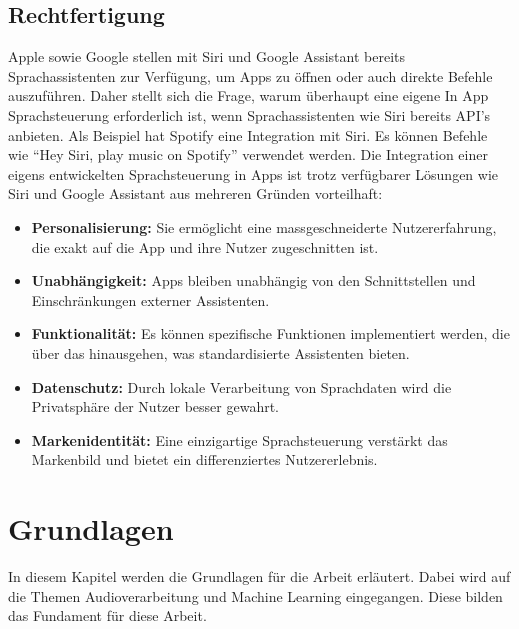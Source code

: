 \documentclass[11pt,a4paper]{article}
\begin{document}
\subsection{Rechtfertigung}
Apple sowie Google stellen mit Siri und Google Assistant bereits Sprachassistenten zur 
Verfügung, um Apps zu öffnen oder auch direkte Befehle auszuführen. Daher stellt sich die Frage, 
warum überhaupt eine eigene In App Sprachsteuerung erforderlich ist, wenn Sprachassistenten wie Siri bereits 
API's anbieten. Als Beispiel hat Spotify eine Integration mit Siri. Es können Befehle wie 
``Hey Siri, play music on Spotify'' verwendet werden. Die Integration einer eigens entwickelten 
Sprachsteuerung in Apps ist trotz verfügbarer Lösungen wie Siri und Google Assistant aus mehreren 
Gründen vorteilhaft:


\begin{itemize}[itemsep=0pt, parsep=0pt]
    \item \textbf{Personalisierung:} Sie ermöglicht eine massgeschneiderte Nutzererfahrung, die 
	exakt auf die App und ihre Nutzer zugeschnitten ist.
    \item \textbf{Unabhängigkeit:} Apps bleiben unabhängig von den Schnittstellen und 
	Einschränkungen externer Assistenten.
    \item \textbf{Funktionalität:} Es können spezifische Funktionen implementiert werden, die über 
	das hinausgehen, was standardisierte Assistenten bieten.
    \item \textbf{Datenschutz:} Durch lokale Verarbeitung von Sprachdaten wird die Privatsphäre der 
	Nutzer besser gewahrt.
    \item \textbf{Markenidentität:} Eine einzigartige Sprachsteuerung verstärkt das Markenbild und 
	bietet ein differenziertes Nutzererlebnis.
\end{itemize}

\noindent 

\newpage \section{Grundlagen}\label{sec:grundlagen}
In diesem Kapitel werden die Grundlagen für die Arbeit erläutert. Dabei wird auf die Themen
Audioverarbeitung und Machine Learning eingegangen. Diese bilden das Fundament für diese Arbeit.
\end{document}
